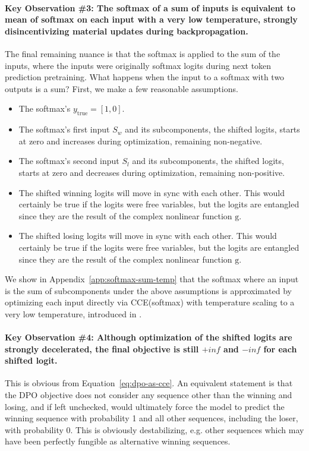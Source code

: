 \documentclass[twoside,11pt]{article}
\begin{document}
\paragraph{Key Observation \#3: The softmax of a sum of inputs 
is equivalent to mean of softmax on each input
with a very low temperature, 
strongly disincentivizing material updates during backpropagation.} 
\label{obs:softmax-cce}
The final remaining nuance is that the softmax is applied to
the sum of the inputs, where the inputs were originally
softmax logits during next
token prediction pretraining. 
What happens when the input to a softmax with two outputs is a sum? First, we make 
a few reasonable assumptions. 
\begin{itemize}
\item The softmax's $y_\mathrm{true} = [1, 0]$. 
\item The softmax's first input $S_w$ and its subcomponents, the shifted logits, starts at zero and increases during optimization, remaining non-negative. 
\item The softmax's second input $S_l$ and its subcomponents, the shifted logits, starts at zero and decreases during optimization, remaining non-positive.
\item The shifted winning logits will move in sync with each other. 
This would certainly be true if the logits were free variables, 
but the logits are entangled since they are the result of 
the complex nonlinear function $\mathrm{g}$. 
\item The shifted losing logits will move in sync with each other.  
This would certainly be true if the logits were free variables, 
but the logits are entangled since they are the result of 
the complex nonlinear function $\mathrm{g}$. 
\end{itemize}

We show in Appendix~\ref{app:softmax-sum-temp} that the softmax where
an input is the sum of subcomponents under the above
assumptions is approximated by optimizing each input directly via CCE(softmax) with
temperature scaling to a very low temperature, introduced in
\cite{hinton2015distilling}. 

\paragraph{Key Observation \#4:
Although optimization of the shifted logits are strongly decelerated, 
the final objective is still $+inf$ and $-inf$ for each shifted logit.} This
is obvious from Equation~\ref{eq:dpo-as-cce}. An equivalent statement is that
the DPO objective does not consider any sequence other than the
winning and losing, and if left unchecked, would ultimately force
the model to predict the winning sequence with probability 1 and all
other sequences, including the loser, with probability 0. This is obviously
destabilizing, e.g. other sequences which may have been perfectly
fungible as alternative winning sequences. 
\end{document}
